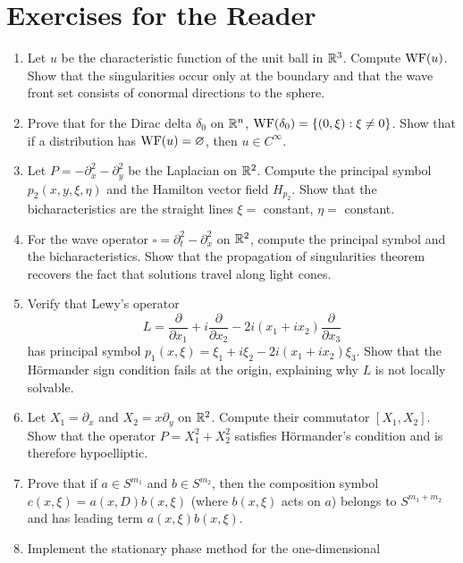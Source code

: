 \section*{Exercises for the Reader}

\begin{enumerate}
    \item [B] Let \(u\) be the characteristic function of the unit ball in
    \(\mathbb{R}^3\). Compute \(\operatorname{WF}(u)\). Show that the singularities occur
    only at the boundary and that the wave front set consists of
    conormal directions to the sphere.
    \item [B] Prove that for the Dirac delta \(\delta_0\) on \(\mathbb{R}^n\),
    \(\operatorname{WF}(\delta_0) = \{(0,\xi): \xi \neq 0\}\). Show that if a
    distribution has \(\operatorname{WF}(u) = \varnothing\), then \(u \in C^\infty\).
    \item [B] Let \(P = -\partial_x^2 - \partial_y^2\) be the Laplacian on
    \(\mathbb{R}^2\). Compute the principal symbol \(p_2(x,y,\xi,\eta)\) and
    the Hamilton vector field \(H_{p_2}\). Show that the
    bicharacteristics are the straight lines \(\xi =\) constant,
    \(\eta =\) constant.
    \item [B] For the wave operator \(\square = \partial_t^2 - \partial_x^2\)
    on \(\mathbb{R}^2\), compute the principal symbol and the bicharacteristics.
    Show that the propagation of singularities theorem recovers the
    fact that solutions travel along light cones.
    \item [I] Verify that Lewy's operator
    \[
    L = \frac{\partial}{\partial x_1} + i\frac{\partial}{\partial x_2}
    - 2i(x_1 + i x_2) \frac{\partial}{\partial x_3}
    \]
    has principal symbol \(p_1(x,\xi) = \xi_1 + i\xi_2 - 2i(x_1 + i x_2)\xi_3\).
    Show that the H\"ormander sign condition fails at the origin,
    explaining why \(L\) is not locally solvable.
    \item [B] Let \(X_1 = \partial_x\) and \(X_2 = x\partial_y\) on \(\mathbb{R}^2\).
    Compute their commutator \([X_1, X_2]\). Show that the operator
    \(P = X_1^2 + X_2^2\) satisfies H\"ormander's condition and is
    therefore hypoelliptic.
    \item [I] Prove that if \(a \in S^{m_1}\) and \(b \in S^{m_2}\), then
    the composition symbol \(c(x,\xi) = a(x,D) b(x,\xi)\) (where
    \(b(x,\xi)\) acts on \(a\)) belongs to \(S^{m_1+m_2}\) and has
    leading term \(a(x,\xi) b(x,\xi)\).
    \item [B] Implement the stationary phase method for the one-dimensional

\end{enumerate}
